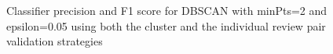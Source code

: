 \begin{figure}[ht]
\begin{center}
{\label{fig:subfig3}}
\caption{Classifier precision and F1 score for DBSCAN with minPts=2 and epsilon=0.05 using both the cluster and the individual review pair validation strategies}    
\label{dbscan-minpts-2-eps-0-05}
\end{center}
\end{figure}

